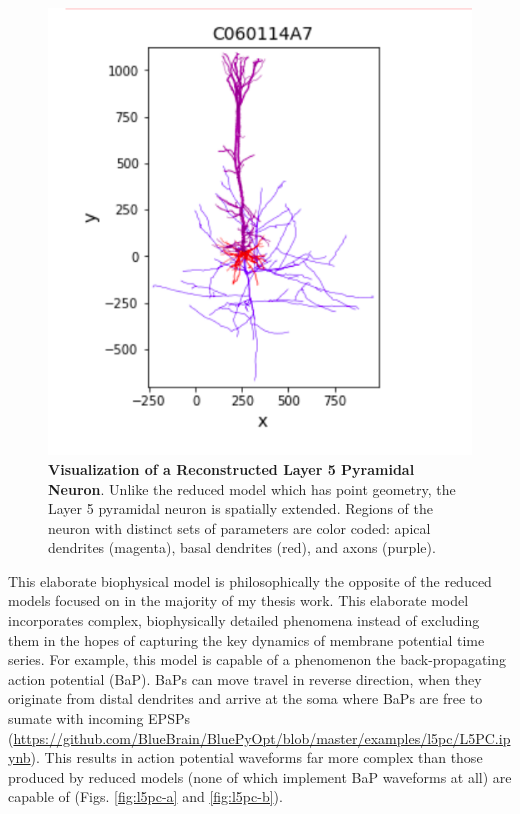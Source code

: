 \begin{figure}%
  \begin{center}
    \includegraphics[scale=0.8]{figures/morphology_view.png}
    \caption[Visualization of a Reconstructed Layer 5 Pyramidal Neuron]{\textbf{Visualization of a Reconstructed Layer 5 Pyramidal Neuron}.
    Unlike the reduced model which has point geometry, the Layer 5 pyramidal neuron is spatially extended.
    Regions of the neuron with distinct sets of parameters are color coded: apical dendrites (magenta), basal dendrites (red), and axons (purple).
    }
  \label{fig:brief_shape}
  \end{center}
\end{figure}

This elaborate biophysical model is philosophically the opposite of the reduced models focused on in the majority of my thesis work. This elaborate model incorporates complex, biophysically detailed phenomena instead of excluding them in the hopes of capturing the key dynamics of membrane potential time series.
For example, this model is capable of a phenomenon the back-propagating action potential (BaP). BaPs can move travel in reverse direction, when they originate from distal dendrites and arrive at the soma where BaPs are free to sumate with incoming EPSPs (\url{https://github.com/BlueBrain/BluePyOpt/blob/master/examples/l5pc/L5PC.ipynb}).
This results in action potential waveforms far more complex than those produced by reduced models (none of which implement BaP waveforms at all) are capable of (Figs. \ref{fig:l5pc-a} and \ref{fig:l5pc-b}).

